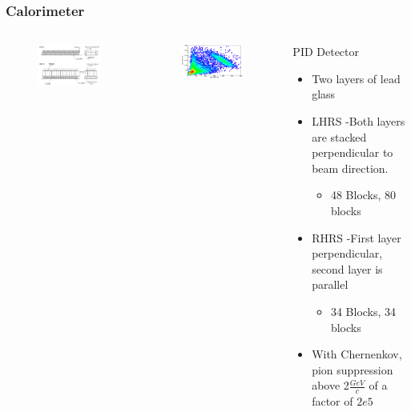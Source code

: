 \documentclass{beamer}
\begin{document}
\begin{frame}
\frametitle{Calorimeter}

\begin{columns}[h]
	\vspace{-25pt}
	\begin{figure}
		\includegraphics[width=6cm]{../images/calo}
	\end{figure}
	\vspace{-10pt}
	\begin{figure}
		\includegraphics[width=6cm]{../images/PR1_2}
	\end{figure}	

	\begin{block}{PID Detector}
	\begin{itemize}
		\item Two layers of lead glass
		\item LHRS -Both layers are stacked perpendicular to beam direction.
		\vspace{-13pt}
 		\begin{itemize}
			\item 48 Blocks, 80 blocks
		\end{itemize}
		\item RHRS -First layer perpendicular, second layer is parallel
		\begin{itemize}
			\item 34 Blocks, 34 blocks
		\end{itemize}
		\item With Chernenkov, pion suppression above 2$\frac{GeV}{c}$ of a factor of $2e5$ \cite{nim}
	\end{itemize}
	\end{block}
\end{columns}
\end{frame}
\end{document}
